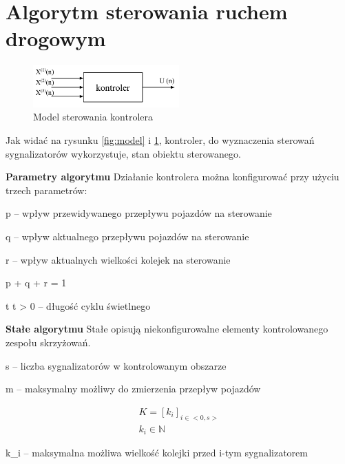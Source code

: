 \section{Algorytm sterowania ruchem drogowym}
\begin{figure}[h]
    \centering
    \includegraphics[width=0.5\textwidth]{images/kontroler.pdf}
    \caption{Model sterowania kontrolera}
    \label{fig:kontroler}
\end{figure}

Jak widać na rysunku \ref{fig:model} i \ref{fig:kontroler}, kontroler, do wyznaczenia sterowań sygnalizatorów wykorzystuje, stan obiektu sterowanego.

\vspace{1.5cm}
\textbf{Parametry algorytmu}
Działanie kontrolera można konfigurować przy użyciu trzech parametrów:
\vspace{0.5cm}

p  \textrm{ -- wpływ przewidywanego przepływu pojazdów na sterowanie}

q  \textrm{ -- wpływ aktualnego przepływu pojazdów na sterowanie}

r  \textrm{ -- wpływ aktualnych wielkości kolejek na sterowanie}

p + q + r = 1

t \in {} \textrm{ } t > 0 \textrm{ -- długość cyklu świetlnego}

\vspace{1.5cm}
\textbf{Stałe algorytmu}
Stałe opisują niekonfigurowalne elementy kontrolowanego zespołu skrzyżowań.
\vspace{0.5cm}

s \in {} \textrm{ -- liczba sygnalizatorów w kontrolowanym obszarze}

m \in {} \textrm{ -- maksymalny możliwy do zmierzenia przepływ pojazdów}

\begin{equation}
	\begin{array}{c}
		K = \left[ k_{i} \right]_{i \in <0,s>}\\
		k_{i} \in \mathbb{N}
	\end{array}
\end{equation}

k_{i} \textrm{ -- maksymalna możliwa wielkość kolejki przed i-tym sygnalizatorem}

